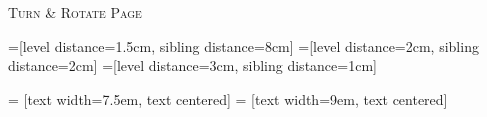 \documentclass[11pt, english]{article}
\begin{document}
	\vspace{\fill}

	\begin{center}
		\textsc{Turn \& Rotate Page}
	\end{center}

\newpage

	\begin{landscape}

	\begin{center}

	=[level distance=1.5cm, sibling distance=8cm]
        =[level distance=2cm, sibling distance=2cm]
        =[level distance=3cm, sibling distance=1cm]

         = [text width=7.5em, text centered]
         = [text width=9em, text centered]


\end{center}
\end{landscape}
\end{document}
